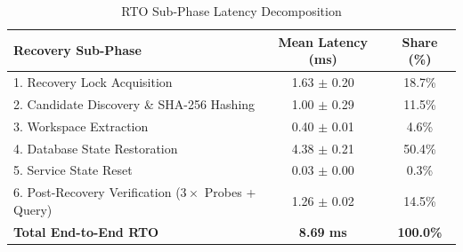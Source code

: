 \begin{table}[htbp]
\caption{RTO Sub-Phase Latency Decomposition}
\label{tab:rto_breakdown}
\centering
\begin{tabular}{|l|c|c|}
\hline
\textbf{Recovery Sub-Phase} & \textbf{Mean Latency (ms)} & \textbf{Share (\%)} \\
\hline
1. Recovery Lock Acquisition & 1.63 $\pm$ 0.20 & 18.7\% \\
2. Candidate Discovery \& SHA-256 Hashing & 1.00 $\pm$ 0.29 & 11.5\% \\
3. Workspace Extraction & 0.40 $\pm$ 0.01 & 4.6\% \\
4. Database State Restoration & 4.38 $\pm$ 0.21 & 50.4\% \\
5. Service State Reset & 0.03 $\pm$ 0.00 & 0.3\% \\
6. Post-Recovery Verification ($3\times$ Probes + Query) & 1.26 $\pm$ 0.02 & 14.5\% \\
\hline
\textbf{Total End-to-End RTO} & \textbf{8.69 ms} & \textbf{100.0\%} \\
\hline
\end{tabular}
\end{table}